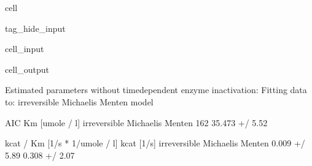 \documentclass[letterpaper,10pt,english]{jupyterBook}
\begin{document}
\begin{sphinxuseclass}{cell}
\begin{sphinxuseclass}{tag_hide_input}
\begin{sphinxVerbatimInput}
\begin{sphinxuseclass}{cell_input}
\begin{sphinxVerbatim}[commandchars=\\\{\}]
         
         
   
     
\end{sphinxVerbatim}

\end{sphinxuseclass}\end{sphinxVerbatimInput}
\begin{sphinxVerbatimOutput}

\begin{sphinxuseclass}{cell_output}
\begin{sphinxVerbatim}[commandchars=\\\{\}]
Estimated parameters without time\PYGZhy{}dependent enzyme inactivation:
Fitting data to:
 \PYGZhy{} irreversible Michaelis Menten model
\end{sphinxVerbatim}

\begin{sphinxVerbatim}[commandchars=\\\{\}]
                               AIC    Km [umole / l]  \PYGZbs{}
irreversible Michaelis Menten \PYGZhy{}162  35.473 +/\PYGZhy{} 5.52\PYGZpc{}   

                              kcat / Km [1/s * 1/umole / l]       kcat [1/s]  
irreversible Michaelis Menten               0.009 +/\PYGZhy{} 5.89\PYGZpc{}  0.308 +/\PYGZhy{} 2.07\PYGZpc{}  
\end{sphinxVerbatim}


\end{sphinxuseclass}
\end{sphinxVerbatimOutput}
\end{sphinxuseclass}
\end{sphinxuseclass}
\end{document}
